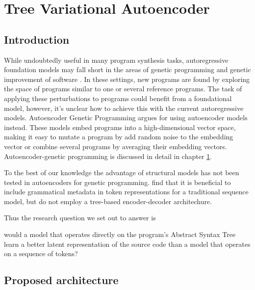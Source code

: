 \chapter{Tree Variational Autoencoder}\label{ch:tree2tree}


\section{Introduction}

While undoubtedly useful in many program synthesis tasks, autoregressive foundation models may fall short in the areas of genetic programming \cite{genprogast} and genetic improvement of software \cite{petke2018:genetic}.
In these settings, new programs are found by exploring the space of programs similar to one or several reference programs.
The task of applying these perturbations to programs could benefit from a foundational model, however, it's unclear how to achieve this with the current autoregressive models.
Autoencoder Genetic Programming \cite{autoenc-gp,wittenbergDenoisingAutoencoderGenetic2023,latentspaceopt} argues for using autoencoder \cite{autoencoders} models instead.
These models embed programs into a high-dimensional vector space, making it easy to mutate a program by add random noise to the embedding vector or combine several programs by averaging their embedding vectors.
Autoencoder-genetic programming is discussed in detail in chapter \ref{ch:tree2tree}.

To the best of our knowledge the advantage of structural models has not been tested in autoencoders for genetic programming. \cite{kusner2017grammar,grammar-vae} find that it is beneficial to include grammatical metadata in token representations for a traditional sequence model, but do not employ a tree-based encoder-decoder architechure.

Thus the research question  we set out to answer is

\begin{highlight}
    would a model that operates directly on the program's Abstract Syntax Tree learn a better latent representation of the source code than a model that operates on a sequence of tokens?
\end{highlight}

\newpage
\section{Proposed architecture}

